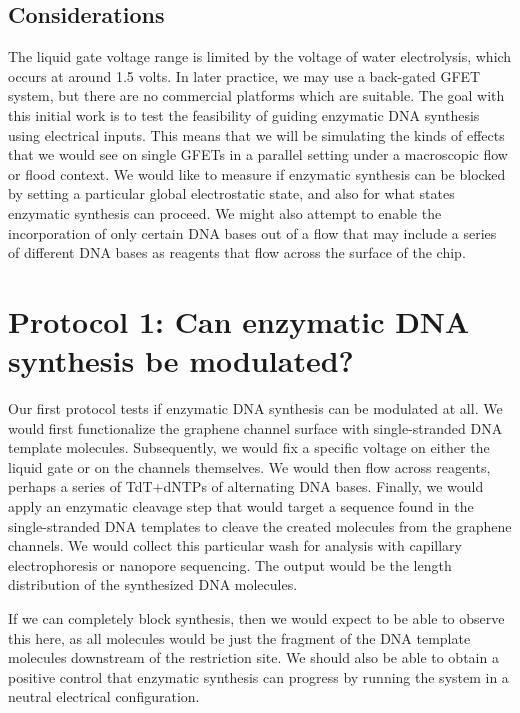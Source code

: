 \documentclass[11pt]{article}
\begin{document}
\subsection*{Considerations}

The liquid gate voltage range is limited by the voltage of water electrolysis, which occurs at around 1.5 volts.
In later practice, we may use a back-gated GFET system, but there are no commercial platforms which are suitable.
The goal with this initial work is to test the feasibility of guiding enzymatic DNA synthesis using electrical inputs.
This means that we will be simulating the kinds of effects that we would see on single GFETs in a parallel setting under a macroscopic flow or flood context.
We would like to measure if enzymatic synthesis can be blocked by setting a particular global electrostatic state, and also for what states enzymatic synthesis can proceed.
We might also attempt to enable the incorporation of only certain DNA bases out of a flow that may include a series of different DNA bases as reagents that flow across the surface of the chip.

\section*{Protocol 1: Can enzymatic DNA synthesis be modulated?}

Our first protocol tests if enzymatic DNA synthesis can be modulated at all.
We would first functionalize the graphene channel surface with single-stranded DNA template molecules.
Subsequently, we would fix a specific voltage on either the liquid gate or on the channels themselves.
We would then flow across reagents, perhaps a series of TdT+dNTPs of alternating DNA bases.
Finally, we would apply an enzymatic cleavage step that would target a sequence found in the single-stranded DNA templates to cleave the created molecules from the graphene channels.
We would collect this particular wash for analysis with capillary electrophoresis or nanopore sequencing.
The output would be the length distribution of the synthesized DNA molecules.

If we can completely block synthesis, then we would expect to be able to observe this here, as all molecules would be just the fragment of the DNA template molecules downstream of the restriction site.
We should also be able to obtain a positive control that enzymatic synthesis can progress by running the system in a neutral electrical configuration.
\end{document}
